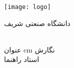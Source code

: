 \begin{center}
\thispagestyle{empty}
\texttt{[image: logo]}

\begin{large}
دانشگاه صنعتی شریف \\ \fadepart{}
\vskip 0.8cm
\fatype{} \falevel{} \\ \famajor{}

\end{large}
\vskip 2cm
{\large{عنوان}} 
\vskip 0.5cm
{\titlefont{\textbf{\fatitle}}}
 cm
\large{نگارش} \\ \Large{\faAuthor}
\vskip 0.75cm
\large{استاد راهنما} \\ \Large{\fasupervisor}
\vskip 2cm
\large{\fadate}
\end{center}

